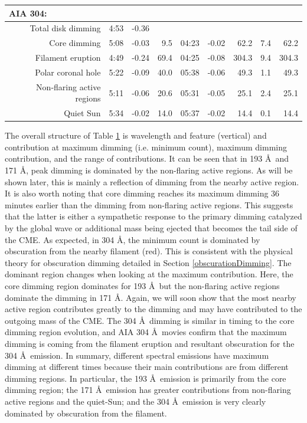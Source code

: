 \begin{table}
\begin{center}
{\begin{tabular}{r|rrr|rrr|r@{-}r}
\multicolumn{1}{l}{AIA 304:} \\
\hline
Total disk dimming & 4:53 & -0.36 & & & & & \\
Core dimming & 5:08 & -0.03 & 9.5 & 04:23 & -0.02 & 62.2 &  7.4 & 62.2 \\
Filament eruption & 4:49 & -0.24 & 69.4 & 04:25 & -0.08 & 304.3 &  9.4 & 304.3 \\
Polar coronal hole & 5:22 & -0.09 & 40.0 & 05:38 & -0.06 & 49.3 &  1.1 & 49.3 \\
Non-flaring active regions & 5:11 & -0.06 & 20.6 & 05:31 & -0.05 & 25.1 &  2.4 & 25.1 \\
Quiet Sun & 5:34 & -0.02 & 14.0 & 05:37 & -0.02 & 14.4 &  0.1 & 14.4 \\
\hline
\end{tabular}
}
\end{center}
\label{tab:aia2011aug4}
\end{table}

The overall structure of Table \ref{tab:aia2011aug4} is wavelength and feature (vertical) and contribution at maximum dimming (i.e. minimum count), maximum dimming contribution, and the range of contributions. It can be seen that in 193 \AA\ and 171 \AA, peak dimming is dominated by the non-flaring active regions. As will be shown later, this is mainly a reflection of dimming from the nearby active region. It is also worth noting that core dimming reaches its maximum dimming 36 minutes earlier than the dimming from non-flaring active regions. This suggests that the latter is either a sympathetic response to the primary dimming catalyzed by the global wave or additional mass being ejected that becomes the tail side of the CME. As expected, in 304 \AA, the minimum count is dominated by obscuration from the nearby filament (red). This is consistent with the physical theory for obscuration dimming detailed in Section \ref{obscurationDimming}. The dominant region changes when looking at the maximum contribution. Here, the core dimming region dominates for 193 \AA\ but the non-flaring active regions dominate the dimming in 171 \AA. Again, we will soon show that the most nearby active region contributes greatly to the dimming and may have contributed to the outgoing mass of the CME. The 304 \AA\ dimming is similar in timing to the core dimming region evolution, and AIA 304 \AA\ movies confirm that the maximum dimming is coming from the filament eruption and resultant obscuration for the 304 \AA\ emission. In summary, different spectral emissions have maximum dimming at different times because their main contributions are from different dimming regions. In particular, the 193 \AA\ emission is primarily from the core dimming region; the 171 \AA\ emission has greater contributions from non-flaring active regions and the quiet-Sun; and the 304 \AA\ emission is very clearly dominated by obscuration from the filament.

